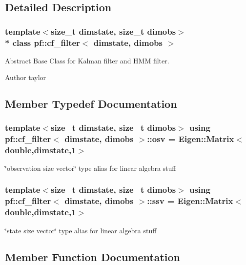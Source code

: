 \subsection{Detailed Description}
\subsubsection*{template$<$size\+\_\+t dimstate, size\+\_\+t dimobs$>$\\*
class pf\+::cf\+\_\+filter$<$ dimstate, dimobs $>$}

Abstract Base Class for Kalman filter and H\+MM filter. 

\begin{DoxyAuthor}{Author}
taylor 
\end{DoxyAuthor}


\subsection{Member Typedef Documentation}
\subsubsection[{\texorpdfstring{osv}{osv}}]{\setlength{\rightskip}{0pt plus 5cm}template$<$size\+\_\+t dimstate, size\+\_\+t dimobs$>$ using {\bf pf\+::cf\+\_\+filter}$<$ dimstate, dimobs $>$\+::{\bf osv} =  Eigen\+::\+Matrix$<$double,dimstate,1$>$}\hypertarget{classpf_1_1cf__filter_ace17376128bb73ee73ff1b5c4972b317}{}\label{classpf_1_1cf__filter_ace17376128bb73ee73ff1b5c4972b317}
\char`\"{}observation size vector\char`\"{} type alias for linear algebra stuff 
\subsubsection[{\texorpdfstring{ssv}{ssv}}]{\setlength{\rightskip}{0pt plus 5cm}template$<$size\+\_\+t dimstate, size\+\_\+t dimobs$>$ using {\bf pf\+::cf\+\_\+filter}$<$ dimstate, dimobs $>$\+::{\bf ssv} =  Eigen\+::\+Matrix$<$double,dimstate,1$>$}\hypertarget{classpf_1_1cf__filter_a448f675e130ac4b340e2c3e545673d0d}{}\label{classpf_1_1cf__filter_a448f675e130ac4b340e2c3e545673d0d}
\char`\"{}state size vector\char`\"{} type alias for linear algebra stuff 

\subsection{Member Function Documentation}
